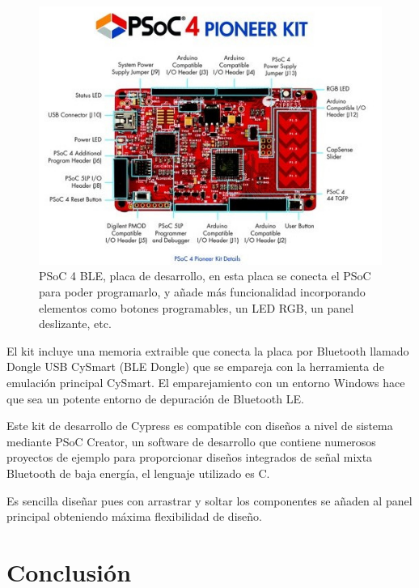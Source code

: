 \begin{figure}[h]%
	\centering
    \includegraphics[scale=0.8]{figures/cypress_placa_desarrollo} %

    \caption[PSoC 4 BLE, placa de desarrollo]{PSoC 4 BLE, placa de desarrollo, en esta placa se conecta el PSoC para poder programarlo, y añade más funcionalidad incorporando elementos como botones programables, un LED RGB, un panel deslizante, etc.}

   \label{figuraCypressGrande}
\end{figure}

El kit incluye una memoria extraible que conecta la placa por Bluetooth llamado Dongle USB CySmart (BLE Dongle) que se empareja con la herramienta de emulación principal CySmart. El emparejamiento con un entorno Windows hace que sea un potente entorno de depuración de Bluetooth LE.

Este kit de desarrollo de Cypress es compatible con diseños a nivel de sistema mediante PSoC Creator, un software de desarrollo que contiene numerosos proyectos de ejemplo para proporcionar diseños integrados de señal mixta Bluetooth de baja energía, el lenguaje utilizado es C.

Es sencilla diseñar pues con arrastrar y soltar los componentes se añaden al panel principal obteniendo máxima flexibilidad de diseño.

\section{Conclusión}
\label{makereference3.5}


